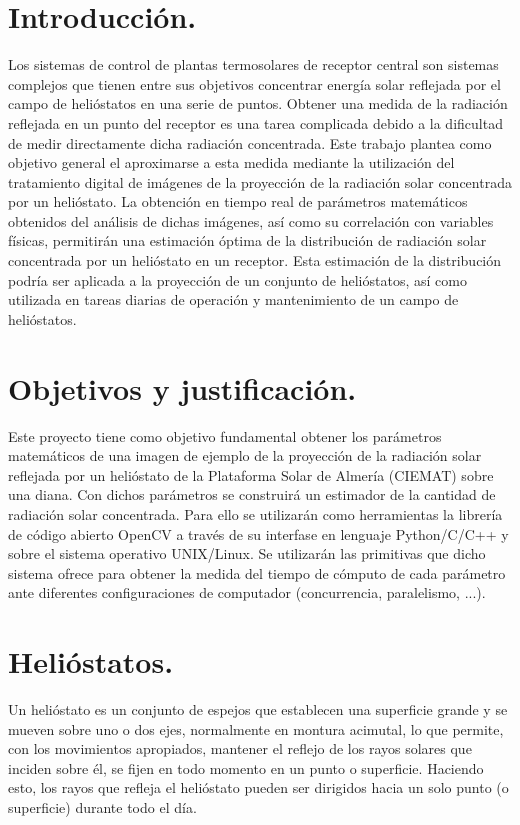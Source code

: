 \section{Introducción.}

Los sistemas de control de plantas termosolares de receptor central son sistemas complejos que tienen entre sus objetivos concentrar energía solar reflejada por el campo de helióstatos en una serie de puntos. Obtener una medida de la radiación reflejada en un punto del receptor es una tarea complicada debido a la dificultad de medir directamente dicha radiación concentrada. Este trabajo plantea como objetivo general el aproximarse a esta medida mediante la utilización del tratamiento digital de imágenes de la proyección de la radiación solar concentrada por un helióstato.
La obtención en tiempo real de parámetros matemáticos obtenidos del análisis de dichas imágenes, así como su correlación con variables físicas, permitirán una estimación óptima de la distribución de radiación solar concentrada por un helióstato en un receptor. Esta estimación de la distribución podría ser aplicada a la proyección de un conjunto de helióstatos, así como utilizada en tareas diarias de operación y mantenimiento de un campo de helióstatos.

\section{Objetivos y justificación.}

Este proyecto tiene como objetivo fundamental obtener los parámetros matemáticos de una imagen de ejemplo de la proyección de la radiación solar reflejada por un helióstato de la Plataforma Solar de Almería (CIEMAT) sobre una diana. Con dichos parámetros se construirá un estimador de la cantidad de radiación solar concentrada.
Para ello se utilizarán como herramientas la librería de código abierto OpenCV a través de su interfase en lenguaje Python/C/C++ y sobre el sistema operativo UNIX/Linux. Se utilizarán las primitivas que dicho sistema ofrece para obtener la medida del tiempo de cómputo de cada parámetro ante diferentes configuraciones de computador (concurrencia, paralelismo, ...). \cite{OpenCVWebSite} \cite{SALWebSite} \cite{IEEEXploreWebSite}

\section{Helióstatos.}

Un helióstato es un conjunto de espejos que establecen una superficie grande y se mueven sobre uno o dos ejes, normalmente en montura acimutal, lo que permite, con los movimientos apropiados, mantener el reflejo de los rayos solares que inciden sobre él, se fijen en todo momento en un punto o superficie. Haciendo esto, los rayos que refleja el helióstato pueden ser dirigidos hacia un solo punto (o superficie) durante todo el día.

